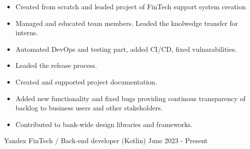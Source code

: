 

\vspace{0cm}\begin{cventries}
\cventry
{
	\vspace{-0.4cm}
	\begin{itemize}
		\item Created from scratch and leaded project of FinTech support system creation
		\item Managed and educated team members. Leaded the knolwedge transfer for interns.
		\item Automated DevOps and testing part, added CI/CD, fixed vulnarabilities. 
		\item Leaded the release process.
		\item Created and supported project documentation.
		\item Added new functionality and fixed bugs providing continous transparency of backlog to business users and other stakeholders.
		\item Contributed to bank-wide design libraries and frameworks.
	\end{itemize}
} %
{Yandex FinTech / Back-end developer (Kotlin)} %
{} %
{June 2023 - Present} %
\noindent	
	

\end{cventries}
